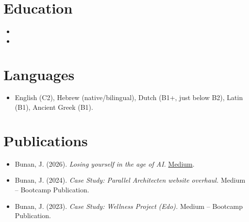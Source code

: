 \documentclass[11pt,a4paper,sans]{moderncv}
\begin{document}
\section{Education}
\vspace{1pt}
\begin{itemize}

\item{}

\vspace{3pt}

\item{}

\end{itemize}


\section{Languages}
\vspace{1pt}
\begin{itemize}
\item English (C2), Hebrew (native/bilingual), Dutch (B1+, just below B2), Latin (B1), Ancient Greek (B1).
\end{itemize}


\section{Publications}
\vspace{1pt}
\begin{itemize}
\item Bunan, J. (2026). \textit{Losing yourself in the age of AI.} \href{https://medium.com/@kobi.bunan}{Medium}.
\item Bunan, J. (2024). \textit{Case Study: Parallel Architecten website overhaul.} Medium -- Bootcamp Publication.
\item Bunan, J. (2023). \textit{Case Study: Wellness Project (Edo).} Medium -- Bootcamp Publication.
\end{itemize}
\end{document}
